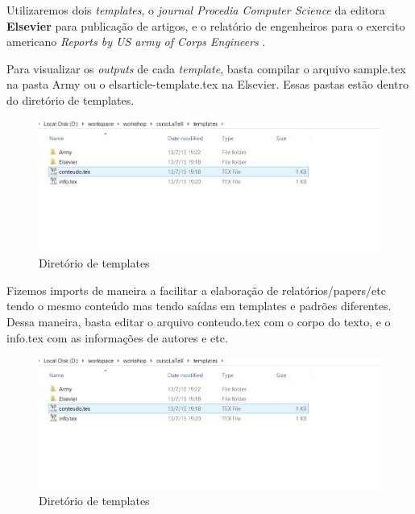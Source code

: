 \begin{frame}
Utilizaremos dois {\it templates}, o {\it journal Procedia Computer Science} da editora \textbf{Elsevier} para publicação de artigos, e o relatório de engenheiros para o exercito americano {\it Reports by US army of Corps Engineers} .

Para visualizar os {\it outputs} de cada {\it template}, basta compilar o arquivo {\ttfamily sample.tex} na pasta Army ou o {\ttfamily elsarticle-template.tex} na Elsevier. Essas pastas estão dentro do diretório de templates.
\begin{figure}
\begin{center}
\includegraphics[scale=0.5]{figuras/template-dir.png}
\caption{Diretório de templates}
\end{center}
\end{figure}
\end{frame}

\begin{frame}
Fizemos imports de maneira a facilitar a elaboração de relatórios/papers/etc tendo o mesmo conteúdo mas tendo saídas em templates e padrões diferentes. Dessa maneira, basta editar o arquivo {\ttfamily conteudo.tex} com o corpo do texto, e o {\ttfamily info.tex} com as informações de autores e etc.
\begin{figure}
\begin{center}
\includegraphics[scale=0.5]{figuras/template-dir.png}
\caption{Diretório de templates}
\end{center}
\end{figure}
\end{frame}


